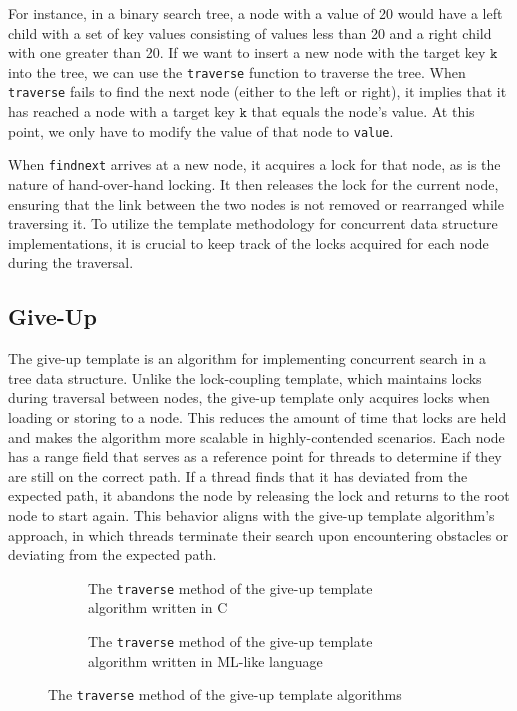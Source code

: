 \documentclass[a4paper,UKenglish,cleveref, autoref, thm-restate]{lipics-v2021}
\begin{document}
For instance, in a binary search tree, a node with a value of 20 would have a left child with a set of key values consisting of values less than 20 and a right child with one greater than 20. If we want to insert a new node with the target key $\texttt{k}$ into the tree, we can use the \lstinline{traverse} function to traverse the tree. When \lstinline{traverse} fails to find the next node (either to the left or right), it implies that it has reached a node with a target key $\texttt{k}$ that equals the node's value. At this point, we only have to modify the value of that node to \lstinline{value}.

When \lstinline{findnext} arrives at a new node, it acquires a lock for that node, as is the nature of hand-over-hand locking. It then releases the lock for the current node, ensuring that the link between the two nodes is not removed or rearranged while traversing it. To utilize the template methodology for concurrent data structure implementations, it is crucial to keep track of the locks acquired for each node during the traversal. 

\subsection{Give-Up}
The give-up template is an algorithm for implementing concurrent search in a tree data structure. Unlike the lock-coupling template, which maintains locks during traversal between nodes, the give-up template only acquires locks when loading or storing to a node. This reduces the amount of time that locks are held and makes the algorithm more scalable in highly-contended scenarios. Each node has a range field that serves as a reference point for threads to determine if they are still on the correct path. If a thread finds that it has deviated from the expected path, it abandons the node by releasing the lock and returns to the root node to start again. This behavior aligns with the give-up template algorithm's approach, in which threads terminate their search upon encountering obstacles or deviating from the expected path.

\begin{figure}[!ht]
	\begin{subfigure}[t]{0.48\textwidth}
		 
		\caption{The \lstinline{traverse} method of the give-up template algorithm written in C}
		\label{traverse_giveup_a}
	\end{subfigure}\qquad
	\begin{subfigure}[t]{0.45\textwidth}
		 
		\caption{The \lstinline{traverse} method of the give-up template algorithm written in ML-like language}
		\label{traverse_giveup_b}	
	\end{subfigure}
	\caption{The \lstinline{traverse} method of the give-up template algorithms}
	\label{traverse_giveup}
\end{figure}
\end{document}

